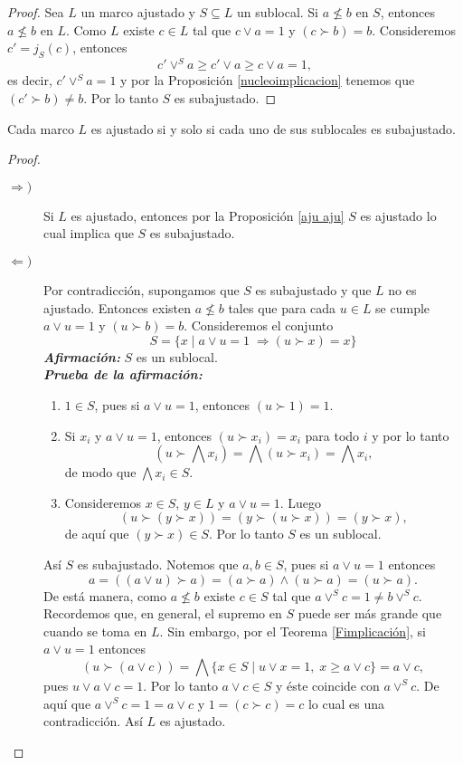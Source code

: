 \begin{proof}
    Sea $L$ un marco ajustado y $S\subseteq L$ un sublocal. Si $a\nleq b$ en $S$, entonces $a\nleq b$ en $L$. Como $L$ existe $c\in L$ tal que $c\vee a=1$ y $(c\succ b)=b$. Consideremos $c'=j_S(c)$, entonces 
    \[
    c'\vee^S a\geq c'\vee a\geq c\vee a=1,
    \]es decir, $c'\vee^S a=1$ y por la Proposición \ref{nucleoimplicacion} tenemos que $(c'\succ b)\neq b$. Por lo tanto $S$ es subajustado.
\end{proof}

\begin{thm}\label{aju saju}
    Cada marco $L$ es ajustado si y solo si cada uno de sus sublocales es subajustado.
\end{thm}

\begin{proof}
    \begin{description}
        \item[$\Rightarrow )$] Si $L$ es ajustado, entonces por la Proposición \ref{aju aju} $S$ es ajustado lo cual implica que $S$ es subajustado. 
        \item[$\Leftarrow )$] Por contradicción, supongamos que $S$ es subajustado y que $L$ no es ajustado. Entonces existen $a\nleq b$ tales que para cada $u\in L$ se cumple $a\vee u=1$ y $(u\succ b)=b$. Consideremos el conjunto 
        \[
        S=\{x\mid a\vee u=1\; \Rightarrow (u\succ x)=x\}
        \]
        \emph{\textbf{Afirmación:}} $S$ es un sublocal.\\

        \noindent
        \emph{\textbf{Prueba de la afirmación:}} 
        \begin{enumerate}
            \item $1\in S$, pues si $a\vee u=1$, entonces $(u\succ 1)=1$.
            \item Si $x_i$ y $a\vee u=1$, entonces $(u\succ x_i)=x_i$ para todo $i$ y por lo tanto
            \[
            (u\succ \bigwedge x_i)=\bigwedge (u\succ x_i)=\bigwedge x_i,
            \]
            de modo que $\bigwedge x_i\in S$.
            \item Consideremos $x\in S$, $y\in L$ y $a\vee u=1$. Luego
            \[
            (u\succ (y\succ x))=(y\succ (u\succ x))=(y\succ x),
            \]
            de aquí que $(y\succ x)\in S$. Por lo tanto $S$ es un sublocal.
        \end{enumerate}
        Así $S$ es subajustado. Notemos que $a, b\in S$, pues si $a\vee u=1$ entonces 
        \[
        a=((a\vee u)\succ a)=(a\succ a)\wedge (u\succ a)=(u\succ a).
        \]
        De está manera, como $a\nleq b$ existe $c\in S$ tal que $a\vee^S c=1\neq b\vee^S c$. Recordemos que, en general, el supremo en $S$ puede ser más grande que cuando se toma en $L$. Sin embargo, por el Teorema \ref{Fimplicación}, si $a\vee u=1$ entonces
        \[
        (u\succ (a\vee c))=\bigwedge \{x\in S\mid u\vee x=1, \; x\geq a\vee c\}=a\vee c,
        \]
        pues $u\vee a\vee c=1$. Por lo tanto $a\vee c\in S$ y éste coincide con $a\vee^S c$. De aquí que $a\vee^Sc=1=a\vee c$ y $1=(c\succ c)=c$ lo cual es una contradicción. Así $L$ es ajustado.
    \end{description}
\end{proof}

